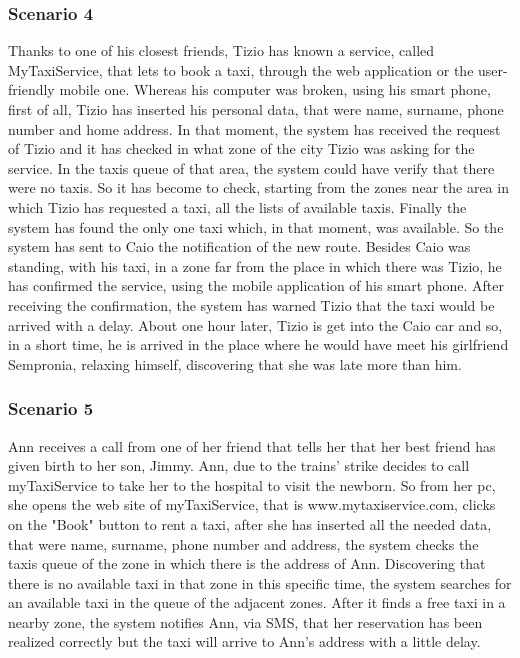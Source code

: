 		\subsubsection{Scenario 4}
		Thanks to one of his closest friends, Tizio has known a service, called MyTaxiService, that lets to book a taxi, through the web application or the user-friendly mobile one.
		Whereas his computer was broken, using his smart phone, first of all, Tizio has inserted his personal data, that were name, surname, phone number and home address. In that moment, the system has received the request of Tizio and it has checked in what zone of the city Tizio was asking for the service. In the taxis queue of that area, the system could have verify that there were no taxis. So it has become to check, starting from the zones near the area in which Tizio has requested a taxi, all the lists of available taxis. 
		Finally the system has found the only one taxi which, in that moment, was available. So the system has sent to Caio the notification of the new route. Besides Caio was standing, with his taxi, in a zone far from the place in which there was Tizio, he has confirmed the service, using the mobile application of his smart phone. After receiving the confirmation, the system has warned Tizio that the taxi would be arrived with a delay.
		About one hour later, Tizio is get into the Caio car and so, in a short time, he is arrived in the place where he would have meet his girlfriend Sempronia, relaxing himself, discovering that she was late more than him.
		
		\subsubsection{Scenario 5}
		Ann receives a call from one of her friend that tells her that her best friend has given birth to her son, Jimmy. Ann, due to the trains' strike decides to call myTaxiService to take her to the hospital to visit the newborn. So from her pc, she opens the web site of myTaxiService, that is www.mytaxiservice.com, clicks on the "Book" button to rent a taxi, after she has inserted all the needed data, that were name, surname, phone number and address, the system checks the taxis queue of the zone in which there is the address of Ann. Discovering that there is no available taxi in that zone in this specific time, the system searches for an available taxi in the queue of the adjacent zones. After it finds a free taxi in a nearby zone, the system notifies Ann, via SMS, that her reservation has been realized correctly but the taxi will arrive to Ann's address with a little delay. 
		
